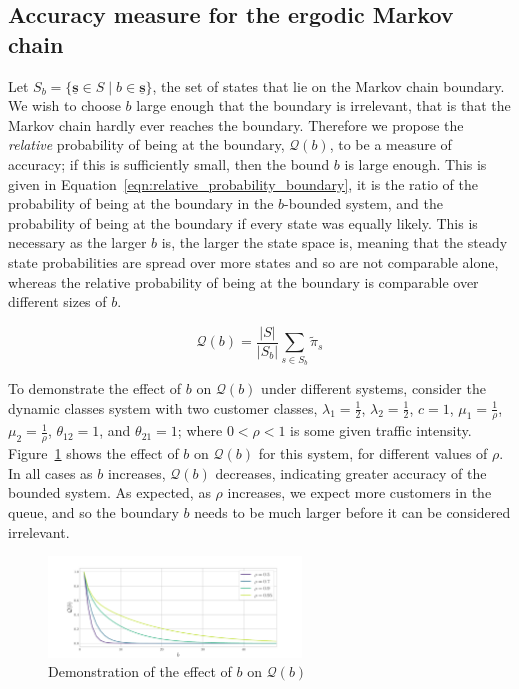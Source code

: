 \documentclass{article}
\begin{document}
\subsection{Accuracy measure for the ergodic Markov chain}\label{sec:ergodic_check}
Let $S_b = \{\underline{\mathbf{s}} \in S \;|\; b \in \underline{\mathbf{s}}\}$,
the set of states that lie on the Markov chain boundary. We wish to choose $b$
large enough that the boundary is irrelevant, that is that the Markov chain
hardly ever reaches the boundary. Therefore we propose the \textit{relative}
probability of being at the boundary, $\mathcal{Q}(b)$, to be a measure of
accuracy; if this is sufficiently small, then the bound $b$ is large enough.
This is given in Equation~\ref{eqn:relative_probability_boundary}, it is the
ratio of the probability of being at the boundary in the $b$-bounded system, and
the probability of being at the boundary if every state was equally likely. This
is necessary as the larger $b$ is, the larger the state space is, meaning that
the steady state probabilities are spread over more states and so are not
comparable alone, whereas the relative probability of being at the boundary is
comparable over different sizes of $b$.

\begin{equation}\label{eqn:relative_probability_boundary}
\mathcal{Q}(b) = \frac{|S|}{|S_b|} \sum_{s \in S_b} \tilde{\pi}_s
\end{equation}

To demonstrate the effect of $b$ on $\mathcal{Q}(b)$ under different systems,
consider the dynamic classes system with two customer classes,
$\lambda_1 = \frac{1}{2}$, $\lambda_2 = \frac{1}{2}$, $c = 1$,
$\mu_1 = \frac{1}{\rho}$, $\mu_2 = \frac{1}{\rho}$, $\theta_{12} = 1$, and
$\theta_{21} = 1$; where $0 < \rho < 1$ is some given traffic intensity.
Figure~\ref{fig:ergodic_check} shows the effect of $b$ on $\mathcal{Q}(b)$ for
this system, for different values of $\rho$. In all cases as $b$ increases,
$\mathcal{Q}(b)$ decreases, indicating greater accuracy of the bounded system.
As expected, as $\rho$ increases, we expect more customers in the queue, and so
the boundary $b$ needs to be much larger before it can be considered irrelevant.

\begin{figure}[!htbp]
  \begin{center}
    \includegraphics[width=0.6\textwidth]{img/quotient_check.pdf}
  \end{center}
  \caption{Demonstration of the effect of $b$ on $\mathcal{Q}(b)$}
  \label{fig:ergodic_check}
\end{figure}
\end{document}
